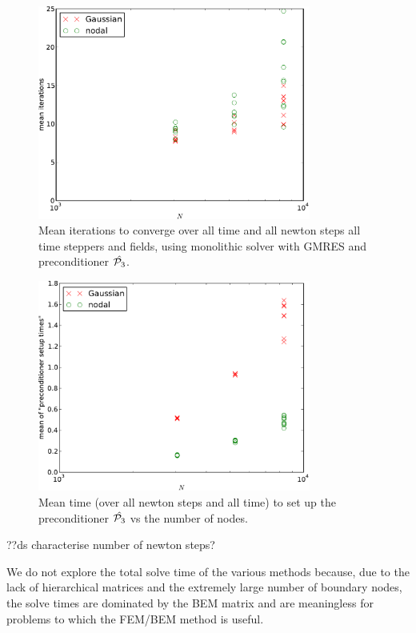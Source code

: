 \begin{figure}
  \centering
  \includegraphics[width=0.8\textwidth]{plots/mumag4_monolithic_its/meanofnsolveritersvsinitialnnode.pdf}
  \caption{Mean iterations to converge over all time and all newton steps all time steppers and fields, using monolithic solver with GMRES and preconditioner $\hat{\mathcal{P}_3}$.}
  \label{fig:mumag4-solver-iterations}
\end{figure}


\begin{figure}
  \centering
  \includegraphics[width=0.8\textwidth]{plots/mumag4_monolithic_its/meanofpreconditionersetuptimesvsinitialnnode.pdf}
  \caption{Mean time (over all newton steps and all time) to set up the preconditioner $\hat{\mathcal{P}_3}$ vs the number of nodes.}
  \label{fig:mumag4-solver-time}
\end{figure}


??ds characterise number of newton steps?


We do not explore the total solve time of the various methods because, due to the lack of hierarchical matrices and the extremely large number of boundary nodes, the solve times are dominated by the BEM matrix and are meaningless for problems to which the FEM/BEM method is useful.



